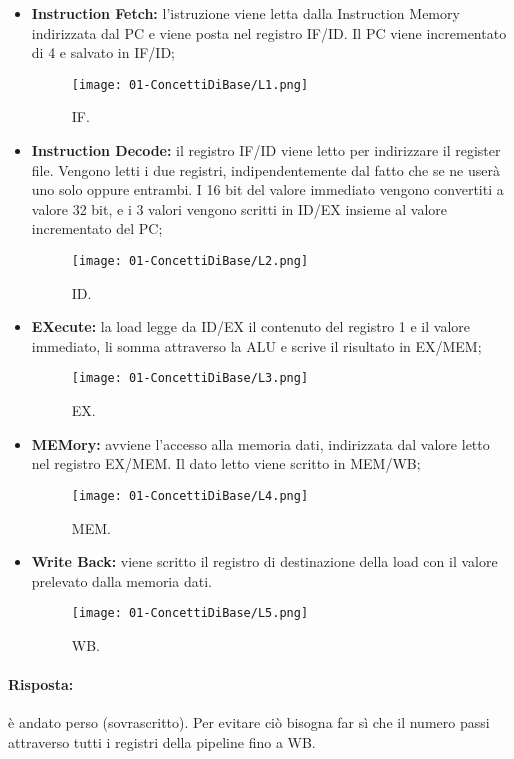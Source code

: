 \begin{itemize}
  \item \textbf{Instruction Fetch:} l'istruzione viene letta dalla Instruction Memory indirizzata dal PC e viene posta nel registro IF/ID. Il PC viene incrementato di 4 e salvato in IF/ID;
    \begin{figure}[h]
    \centering
    \texttt{[image: 01-ConcettiDiBase/L1.png]}
    \caption{IF.}
\end{figure}
  \item \textbf{Instruction Decode:} il registro IF/ID viene letto per indirizzare il register file. Vengono letti i due registri, indipendentemente dal fatto che se ne userà uno solo oppure entrambi. I 16 bit del valore immediato vengono convertiti a valore 32 bit, e i 3 valori vengono scritti in ID/EX insieme al valore incrementato del PC;
    \begin{figure}[h]
    \centering
    \texttt{[image: 01-ConcettiDiBase/L2.png]}
    \caption{ID.}
\end{figure}
\pagebreak
\item \textbf{EXecute:} la load legge da ID/EX il contenuto del registro 1 e il valore immediato, li somma attraverso la ALU e scrive il risultato in EX/MEM;
    \begin{figure}[h]
    \centering
    \texttt{[image: 01-ConcettiDiBase/L3.png]}
    \caption{EX.}
\end{figure}
  \item \textbf{MEMory:} avviene l'accesso alla memoria dati, indirizzata dal valore letto nel registro EX/MEM. Il dato letto viene scritto in MEM/WB;
    \begin{figure}[h]
    \centering
    \texttt{[image: 01-ConcettiDiBase/L4.png]}
    \caption{MEM.}
\end{figure}
  \item \textbf{Write Back:} viene scritto il registro di destinazione della load con il valore prelevato dalla memoria dati.
    \begin{figure}[h]
    \centering
    \texttt{[image: 01-ConcettiDiBase/L5.png]}
    \caption{WB.}
\end{figure}

\end{itemize}
\pagebreak
{}

\paragraph{Risposta:} è andato perso (sovrascritto). Per evitare ciò bisogna far sì che il numero passi attraverso tutti i registri della pipeline fino a WB.

